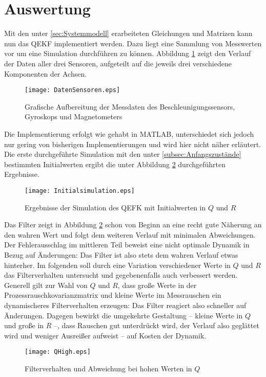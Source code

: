 \documentclass[12pt,a4paper]{article}
\begin{document}
		\section{Auswertung}
		Mit den unter \ref{sec:Systemmodell} erarbeiteten Gleichungen und Matrizen kann nun das QEKF implementiert werden. Dazu liegt eine Sammlung von Messwerten vor um eine Simulation durchführen zu können. Abbildung \ref{fig:DatenSensoren} zeigt den Verlauf der Daten aller drei Sensoren, aufgeteilt auf die jeweils drei verschiedene Komponenten der Achsen.
		\begin{figure}[!ht]
			\hspace{-2cm}
			\texttt{[image: DatenSensoren.eps]}
			\caption{\label{fig:DatenSensoren}\centering Grafische Aufbereitung der Messdaten des Beschleunigungssensors, Gyroskops und Magnetometers}
		\end{figure}
		Die Implementierung erfolgt wie gehabt in MATLAB, unterschiedet sich jedoch nur gering von bisherigen Implementierungen und wird hier nicht näher erläutert.\\
		
		Die erste durchgeführte Simulation mit den unter \ref{subsec:Anfangszustände} bestimmten Initialwerten ergibt die unter Abbildung \ref{fig:Initialsimulation} durchgeführten Ergebnisse.
		\begin{figure}[!ht]
			\hspace{-2cm}
			\texttt{[image: Initialsimulation.eps]}
			\caption{\label{fig:Initialsimulation}\centering Ergebnisse der Simulation des QEFK mit Initialwerten in $Q$ und $R$}
		\end{figure}
		Das Filter zeigt in Abbildung \ref{fig:Initialsimulation} schon von Beginn an eine recht gute Näherung an den wahren Wert und folgt dem weiteren Verlauf mit minimalen Abweichungen. Der Fehlerausschlag im mittleren Teil beweist eine nicht optimale Dynamik in Bezug auf Änderungen: Das Filter ist also stets dem wahren Verlauf etwas hinterher. Im folgenden soll durch eine Variation verschiedener Werte in $Q$ und $R$ das Filterverhalten untersucht und gegebenenfalls auch verbessert werden.\\
		
		Generell gilt zur Wahl von $Q$ und $R$, dass große Werte in der Prozessrauschkovarianzmatrix und kleine Werte im Messrauschen ein dynamischeres Filterverhalten erzeugen: Das Filter reagiert also schneller auf Änderungen. Dagegen bewirkt die umgekehrte Gestaltung -- kleine Werte in $Q$ und große in $R$ --, dass Rauschen gut unterdrückt wird, der Verlauf also geglättet wird und weniger Ausreißer aufweist -- auf Kosten der Dynamik.\\
		\begin{figure}[!ht]
			\hspace{-2cm}
			\texttt{[image: QHigh.eps]}
			\caption{\label{fig:QHigh}\centering Filterverhalten und Abweichung bei hohen Werten in $Q$}
		\end{figure}
	
\end{document}
